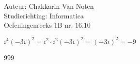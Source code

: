 \documentclass[a4paper]{article}
\begin{document}
  
\noindent \large Auteur: Chakkarin Van Noten \\
\noindent \large Studierichting: Informatica\\
\noindent \large Oefeningenreeks 1B nr. 16.10\\

\medskip

\normalsize

$i^{4}(-3i)^{2} = i^{2} \cdot i^{2}(-3i)^{2} = (-3i)^{2} = -9$

\begin{thebibliography}{999}
\end{thebibliography}
\end{document}
